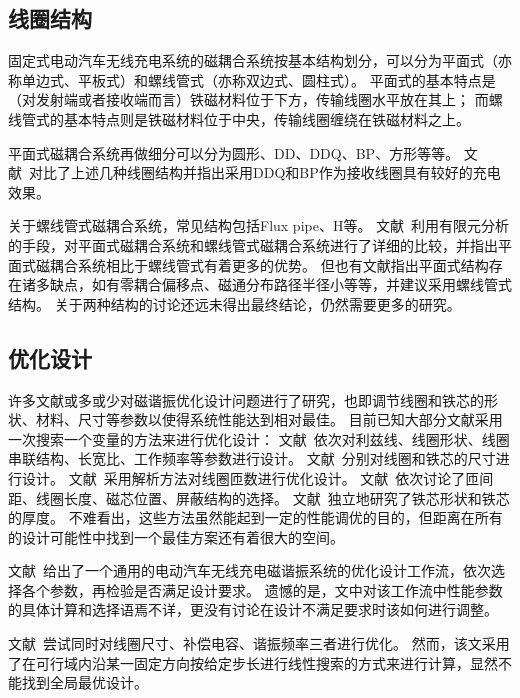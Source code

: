 \documentclass[index]{subfiles}
\begin{document}
\subsection{线圈结构}
固定式电动汽车无线充电系统的磁耦合系统按基本结构划分，可以分为平面式（亦称单边式、平板式）和螺线管式（亦称双边式、圆柱式）\cite{高大威2015}。
平面式的基本特点是（对发射端或者接收端而言）铁磁材料位于下方，传输线圈水平放在其上；
而螺线管式的基本特点则是铁磁材料位于中央，传输线圈缠绕在铁磁材料之上。

平面式磁耦合系统再做细分可以分为圆形\cite{budhia2011}、DD\cite{budhia2013}、DDQ\cite{budhia2013}、BP\cite{covic2011}、方形\cite{choi2014}等等。
文献~对比了上述几种线圈结构并指出采用DDQ和BP作为接收线圈具有较好的充电效果。

关于螺线管式磁耦合系统，常见结构包括Flux pipe\cite{budhia2010}、H\cite{takanashi2012}等。
文献~利用有限元分析的手段，对平面式磁耦合系统和螺线管式磁耦合系统进行了详细的比较，并指出平面式磁耦合系统相比于螺线管式有着更多的优势。
但也有文献\cite{唐云宇2015}指出平面式结构存在诸多缺点，如有零耦合偏移点、磁通分布路径半径小等等，并建议采用螺线管式结构。
关于两种结构的讨论还远未得出最终结论，仍然需要更多的研究。

\subsection{优化设计}
许多文献或多或少对磁谐振优化设计问题进行了研究，也即调节线圈和铁芯的形状、材料、尺寸等参数以使得系统性能达到相对最佳。
目前已知大部分文献采用一次搜索一个变量的方法来进行优化设计：
文献~依次对利兹线、线圈形状、线圈串联结构、长宽比、工作频率等参数进行设计。
文献~分别对线圈和铁芯的尺寸进行设计。
文献~采用解析方法对线圈匝数进行优化设计。
文献~依次讨论了匝间距、线圈长度、磁芯位置、屏蔽结构的选择。
文献~独立地研究了铁芯形状和铁芯的厚度。
不难看出，这些方法虽然能起到一定的性能调优的目的，但距离在所有的设计可能性中找到一个最佳方案还有着很大的空间。

文献~给出了一个通用的电动汽车无线充电磁谐振系统的优化设计工作流，依次选择各个参数，再检验是否满足设计要求。
遗憾的是，文中对该工作流中性能参数的具体计算和选择语焉不详，更没有讨论在设计不满足要求时该如何进行调整。

文献~尝试同时对线圈尺寸、补偿电容、谐振频率三者进行优化。
然而，该文采用了在可行域内沿某一固定方向按给定步长进行线性搜索的方式来进行计算，显然不能找到全局最优设计。
\end{document}
